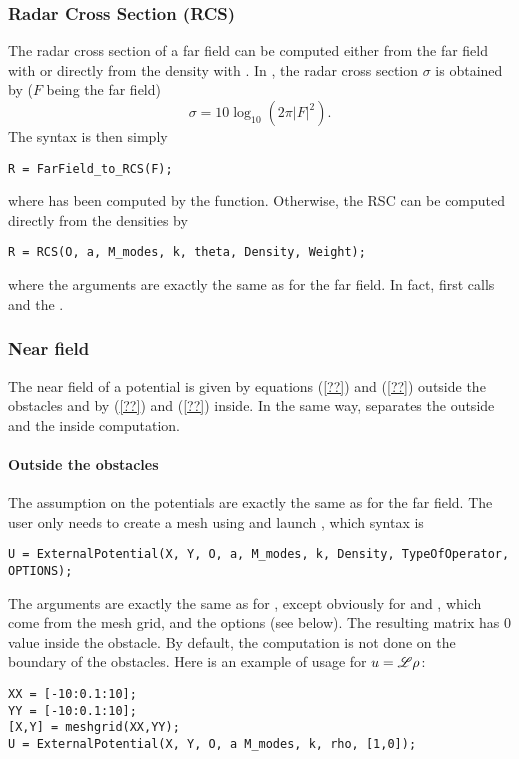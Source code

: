 \subsubsection{Radar Cross Section (RCS)}

The radar cross section of a far field can be computed either from the far field with  or directly from the density with . In \mudiff, the radar cross section $\sigma$ is obtained by ($F$ being the far field)
$$
\sigma = 10\log_{10}(2\pi|F|^2).
$$
The syntax is then simply
\begin{verbatim}
R = FarField_to_RCS(F);
\end{verbatim}
where  has been computed by the  function. Otherwise, the RSC can be computed directly from the densities by
\begin{verbatim}
R = RCS(O, a, M_modes, k, theta, Density, Weight);
\end{verbatim}
where the arguments are exactly the same as for the far field. In fact,  first calls  and the .

\subsubsection{Near field}

The near field of a potential is given by equations (\ref{??}) and (\ref{??}) outside the obstacles and by (\ref{??}) and (\ref{??}) inside. In the same way, \mudiff separates the outside and the inside computation.


\paragraph{Outside the obstacles}
The assumption on the potentials are exactly the same as for the far field. The user only needs to create a mesh using \eg {} and launch , which syntax is
\begin{verbatim}
U = ExternalPotential(X, Y, O, a, M_modes, k, Density, TypeOfOperator, OPTIONS);
\end{verbatim}
The arguments are exactly the same as for , except obviously for  and , which come from the mesh grid, and the options (see below). The resulting matrix  has $0$ value inside the obstacle. By default, the computation is not done on the boundary of the obstacles. Here is an example of usage for $u={\mathscr L}\rho$:
\begin{verbatim}
XX = [-10:0.1:10];
YY = [-10:0.1:10];
[X,Y] = meshgrid(XX,YY);
U = ExternalPotential(X, Y, O, a M_modes, k, rho, [1,0]);
\end{verbatim}


